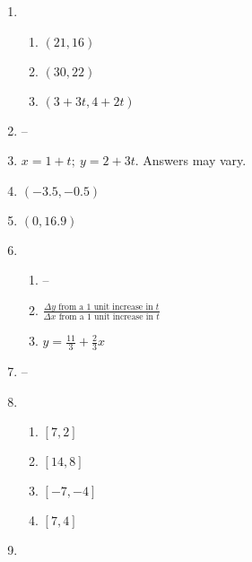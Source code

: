 \documentclass{article}
\begin{document}
\begin{enumerate}
\item 

	\begin{enumerate}
	
	\item $(21, 16)$

	\item $(30, 22)$
	
	\item $(3 + 3t, 4 + 2t)$
	
	\end{enumerate}
	
\item --

\item $x = 1 + t; \ y = 2 + 3t.$ Answers may vary.

\item $(-3.5, -0.5)$

\item $(0, 16.9)$

\item

	\begin{enumerate}
	
	\item --
	
	\item $\frac{\Delta y \text{ from a 1 unit increase in } t}{\Delta x \text{ from a 1 unit increase in } t}$
	
	\item $y = \frac{11}{3} + \frac{2}{3}x$
	
	\end{enumerate}
	
\item --

\item

	\begin{enumerate}
	
	\item $[7, 2]$
	
	\item $[14, 8]$
	
	\item $[-7, -4]$
	
	\item $[7, 4]$
	
	\end{enumerate}
	
\item

	\begin{enumerate}
	

\end{enumerate}
\end{enumerate}
\end{document}
